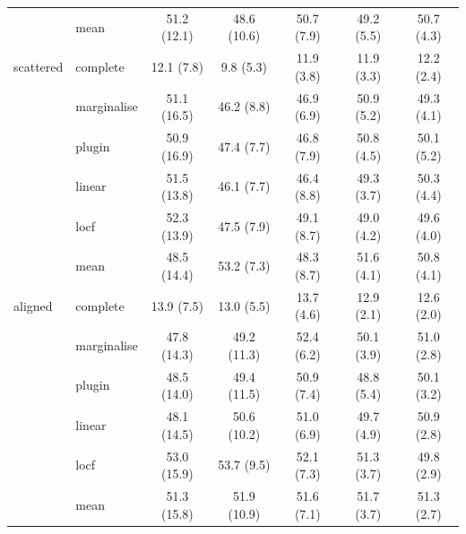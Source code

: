 \begin{table}[htbp]
\begin{tabular}{llccccc}
     & mean & 51.2 (12.1) & 48.6 (10.6) & 50.7 (7.9) & 49.2 (5.5) & 50.7 (4.3) \\
    \addlinespace
    scattered & complete & 12.1 (7.8) & 9.8 (5.3) & 11.9 (3.8) & 11.9 (3.3) & 12.2 (2.4) \\
     & marginalise & 51.1 (16.5) & 46.2 (8.8) & 46.9 (6.9) & 50.9 (5.2) & 49.3 (4.1) \\
     & plugin & 50.9 (16.9) & 47.4 (7.7) & 46.8 (7.9) & 50.8 (4.5) & 50.1 (5.2) \\
     & linear & 51.5 (13.8) & 46.1 (7.7) & 46.4 (8.8) & 49.3 (3.7) & 50.3 (4.4) \\
     & locf & 52.3 (13.9) & 47.5 (7.9) & 49.1 (8.7) & 49.0 (4.2) & 49.6 (4.0) \\
     & mean & 48.5 (14.4) & 53.2 (7.3) & 48.3 (8.7) & 51.6 (4.1) & 50.8 (4.1) \\
    \addlinespace
    aligned & complete & 13.9 (7.5) & 13.0 (5.5) & 13.7 (4.6) & 12.9 (2.1) & 12.6 (2.0) \\
     & marginalise & 47.8 (14.3) & 49.2 (11.3) & 52.4 (6.2) & 50.1 (3.9) & 51.0 (2.8) \\
     & plugin & 48.5 (14.0) & 49.4 (11.5) & 50.9 (7.4) & 48.8 (5.4) & 50.1 (3.2) \\
     & linear & 48.1 (14.5) & 50.6 (10.2) & 51.0 (6.9) & 49.7 (4.9) & 50.9 (2.8) \\
     & locf & 53.0 (15.9) & 53.7 (9.5) & 52.1 (7.3) & 51.3 (3.7) & 49.8 (2.9) \\
     & mean & 51.3 (15.8) & 51.9 (10.9) & 51.6 (7.1) & 51.7 (3.7) & 51.3 (2.7) \\
    \bottomrule
  \end{tabular}
\end{table}
